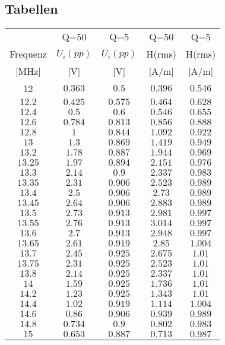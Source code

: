 \documentclass[12pt,a4paper,ngerman]{article}
\begin{document}
\subsection{Tabellen}
\centering
\begin{tabular}{ |c|c|c|c|c| }
  \hline
     & Q=50 & Q=5 & Q=50 & Q=5\\

    Frequenz & $U_i(pp)$ & $U_i(pp)$ & H(rms) & H(rms)\\

  [MHz] & [V] & [V] & [A/m] & [A/m] \\
  \hline
  12 & $0.363$ & $0.5$ & $0.396$ & $0.546$ \\
  \hline
  $12.2$ & $0.425$ & $0.575$ & $0.464$ & $0.628$ \\
  \hline
  $12.4$ & $0.5$ & $0.6$ & $0.546$ & $0.655$ \\
  \hline
  $12.6$ & $0.784$ & $0.813$ & $0.856$ & $0.888$ \\
    \hline
  $12.8$ & $1$ & $0.844$ & $1.092$ & $0.922$ \\
    \hline
  $13$ & $1.3$ & $0.869$ & $1.419$ & $0.949$ \\
    \hline
  $13.2$ & $1.78$ & $0.887$ & $1.944$ & $0.969$ \\
     \hline
  $13.25$ & $1.97$ & $0.894$ & $2.151$ & $0.976$ \\ 
    \hline
  $13.3$ & $2.14$ & $0.9$ & $2.337$ & $0.983$ \\
    \hline
  $13.35$ & $2.31$ & $0.906$ & $2.523$ & $0.989$ \\
    \hline
  $13.4$ & $2.5$ & $0.906$ & $2.73$ & $0.989$ \\
    \hline
  $13.45$ & $2.64$ & $0.906$ & $2.883$ & $0.989$ \\
    \hline
  $13.5$ & $2.73$ & $0.913$ & $2.981$ & $0.997$ \\
     \hline
  $13.55$ & $2.76$ & $0.913$ & $3.014$ & $0.997$ \\
      \hline
  $13.6$ & $2.7$ & $0.913$ & $2.948$ & $0.997$ \\ 
      \hline
  $13.65$ & $2.61$ & $0.919$ & $2.85$ & $1.004$ \\
      \hline
  $13.7$ & $2.45$ & $0.925$ & $2.675$ & $1.01$ \\
      \hline
  $13.75$ & $2.31$ & $0.925$ & $2.523$ & $1.01$ \\
      \hline
  $13.8$ & $2.14$ & $0.925$ & $2.337$ & $1.01$ \\
      \hline
  $14$ & $1.59$ & $0.925$ & $1.736$ & $1.01$ \\
      \hline
  $14.2$ & $1.23$ & $0.925$ & $1.343$ & $1.01$ \\
      \hline
  $14.4$ & $1.02$ & $0.919$ & $1.114$ & $1.004$ \\
      \hline
  $14.6$ & $0.86$ & $0.906$ & $0.939$ & $0.989$ \\
      \hline
  $14.8$ & $0.734$ & $0.9$ & $0.802$ & $0.983$ \\
      \hline
  $15$ & $0.653$ & $0.887$ & $0.713$ & $0.987$ \\
      \hline
  \hline
 
\end{tabular}
\end{document}
